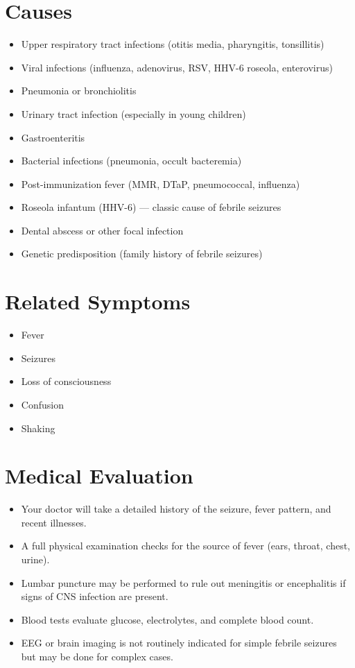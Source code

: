 \section*{Causes}
\begin{itemize}
  \item Upper respiratory tract infections (otitis media, pharyngitis, tonsillitis)
  \item Viral infections (influenza, adenovirus, RSV, HHV-6 roseola, enterovirus)
  \item Pneumonia or bronchiolitis
  \item Urinary tract infection (especially in young children)
  \item Gastroenteritis
  \item Bacterial infections (pneumonia, occult bacteremia)
  \item Post-immunization fever (MMR, DTaP, pneumococcal, influenza)
  \item Roseola infantum (HHV-6) — classic cause of febrile seizures
  \item Dental abscess or other focal infection
  \item Genetic predisposition (family history of febrile seizures)
\end{itemize}

\section*{Related Symptoms}
\begin{itemize}
  \item Fever
  \item Seizures
  \item Loss of consciousness
  \item Confusion
  \item Shaking
\end{itemize}

\section*{Medical Evaluation}
\begin{itemize}
  \item Your doctor will take a detailed history of the seizure, fever pattern, and recent illnesses.
  \item A full physical examination checks for the source of fever (ears, throat, chest, urine).
  \item Lumbar puncture may be performed to rule out meningitis or encephalitis if signs of CNS infection are present.
  \item Blood tests evaluate glucose, electrolytes, and complete blood count.
  \item EEG or brain imaging is not routinely indicated for simple febrile seizures but may be done for complex cases.
\end{itemize}

